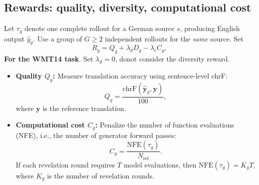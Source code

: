 \documentclass[11pt,a4paper]{article}
\begin{document}
\subsection{Rewards: quality, diversity, computational cost}
Let $\tau_g$ denote one complete rollout for a German source $s$, producing English output $\widehat y_g$. Use a group of $G\ge2$ independent rollouts for the \emph{same} source. Set
\begin{equation}
\boxed{R_g= Q_g+\lambda_d D_g-\lambda_c C_g,}\label{eq:reward}
\end{equation}
\textbf{For the WMT14 task}. Set $\lambda_{d} = 0$, donot consider the diversity reward.
\begin{itemize}
\item \textbf{Quality $Q_g$:}
    Measure translation accuracy using sentence-level chrF:
    \[
    Q_g = \frac{\mathrm{chrF}(\widehat{\bm{y}}_g,\bm{y})}{100},
    \]
    where $\bm{y}$ is the reference translation.

    \item \textbf{Computational cost $C_g$:}
    Penalize the number of function evaluations (NFE),
    i.e., the number of generator forward passes:
    \[
    C_g = \frac{\mathrm{NFE}(\tau_g)}{N_{\mathrm{ref}}}.
    \]
    If each revelation round requires $T$ model evaluations,
    then $\mathrm{NFE}(\tau_g)=K_gT$, where $K_g$ is the
    number of revelation rounds.
\end{itemize}
\end{document}
